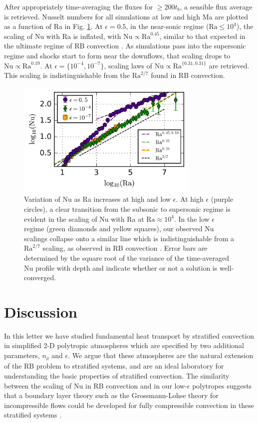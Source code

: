 \documentclass[aps, prl, twocolumn, nofootinbib, groupedaddress, amsfonts, amssymb, amsmath]{revtex4-1}
\newcommand{\nrho}{\ensuremath{n_{\rho}}}
\begin{document}
After appropriately time-averaging the fluxes for $\geq 200 t_b$, 
a sensible flux average is retrieved.  Nusselt numbers for
all simulations at low and high Ma are plotted as a function of Ra in Fig. \ref{fig:nu_v_ra}.  
At $\epsilon = 0.5$, in the near-sonic
regime ($\text{Ra} \leq 10^4$), the scaling of Nu with Ra is inflated,
with $\text{Nu} \propto \text{Ra}^{0.45}$, similar to that expected in the
ultimate regime of RB convection \cite{ahlers&all2009}.  As simulations
pass into the supersonic regime and shocks start to form near the downflows,
that scaling drops to $\text{Nu} \propto \text{Ra}^{0.19}$.  
At $\epsilon = \{10^{-4}, 10^{-7}\}$,
scaling laws of $\text{Nu} \propto \text{Ra}^{\{0.31, 0.31\}}$ are retrieved. 
This scaling is indistinguishable from the $\text{Ra}^{2/7}$ found in RB
convection.


\begin{figure}[t]
\includegraphics[width=3.4375in]{./figs/nu_v_ra.png}
\caption{Variation of Nu as Ra increases at high and low $\epsilon$. 
At high $\epsilon$ (purple circles), 
a clear transition from the subsonic to supersonic regime is evident in the scaling
of Nu with Ra at $\text{Ra} \approx 10^4$.  In the low $\epsilon$ regime (green diamonds and yellow squares), 
our observed Nu scalings collapse onto a similar line which is
indistinguishable from a $\text{Ra}^{2/7}$ scaling, 
as observed in RB convection \cite{johnston&doering2009}.  Error bars are determined
 by the square root of the variance of the time-averaged Nu profile with depth and 
 indicate whether or not a solution is well-converged.
\label{fig:nu_v_ra} }
\end{figure}

\section{Discussion}
\label{sec:discussion}
In this letter we have studied fundamental heat transport by 
stratified convection in simplified 2-D polytropic
atmospheres which are specified by two additional parameters, $\nrho$ 
and $\epsilon$.  We argue that these atmospheres are the natural extension
of the RB problem to stratified systems, 
and are an ideal laboratory for understanding the basic properties of stratified
convection.  The similarity between the scaling of Nu in RB 
convection and in our low-$\epsilon$ polytropes suggests 
that a boundary layer theory such as the Grossmann-Lohse theory for incompressible flows
could be developed for fully compressible 
convection in these stratified systems \cite{ahlers&all2009}.  
\end{document}
